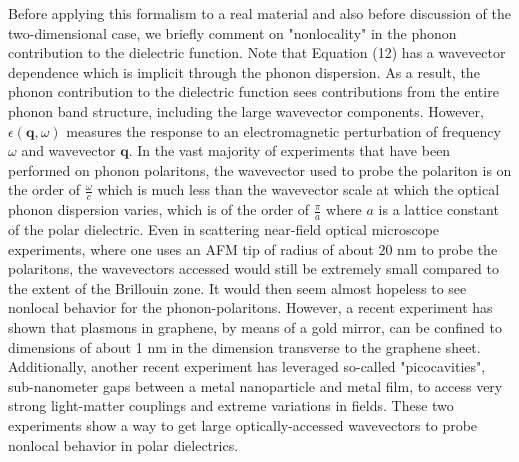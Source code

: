 \documentclass[aps,prb,twocolumn,
	groupedaddress,superscriptaddress,
	amsfonts,amssymb,amsmath,floatfix,
	citeautoscript]{revtex4-1}
\begin{document}
Before applying this formalism to a real material and also before discussion of the two-dimensional case, we briefly comment on "nonlocality" in the phonon contribution to the dielectric function. Note that Equation (12) has a wavevector dependence which is implicit through the phonon dispersion. As a result, the phonon contribution to the dielectric function sees contributions from the entire phonon band structure, including the large wavevector components. However, $\epsilon(\mathbf{q},\omega)$ measures the response to an electromagnetic perturbation of frequency $\omega$ and wavevector $\mathbf{q}$. In the vast majority of experiments that have been performed on phonon polaritons, the wavevector used to probe the polariton is on the order of $\frac{\omega}{c}$ which is much less than the wavevector scale at which the optical phonon dispersion varies, which is of the order of $\frac{\pi}{a}$ where $a$ is a lattice constant of the polar dielectric.  Even in scattering near-field optical microscope experiments, where one uses an AFM tip of radius of about $20$ nm to probe the polaritons, the wavevectors accessed would still be extremely small compared to the extent of the Brillouin zone. It would then seem almost hopeless to see nonlocal behavior for the phonon-polaritons. However, a recent experiment \cite{iranzo2018probing} has shown that plasmons in graphene, by means of a gold mirror, can be confined to dimensions of about 1 nm in the dimension transverse to the graphene sheet. Additionally, another recent experiment \cite{benz2016single} has leveraged so-called "picocavities", sub-nanometer gaps between a metal nanoparticle and metal film, to access very strong light-matter couplings and extreme variations in fields. These two experiments show a way to get large optically-accessed wavevectors to probe nonlocal behavior in polar dielectrics.
\end{document}
